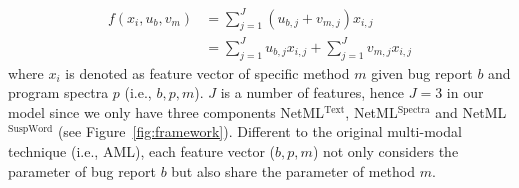 \begin{align}
\label{eq:aml_plus}
f(x_{i}, u_b, v_m) & = \sum_{j = 1}^{J} (u_{b,j} + v_{m,j}) x_{i,j} \nonumber \\
& = \sum_{j = 1}^{J} u_{b,j} x_{i,j} + \sum_{j = 1}^{J} v_{m,j} x_{i,j}
\end{align}
where $x_i$ is denoted as feature vector of specific method $m$ given bug report $b$ and program spectra $p$ (i.e., $b, p, m$). $J$ is a number of features, hence $J = 3$ in our model since we only have three components NetML$^\text{Text}$, NetML$^\text{Spectra}$ and NetML$^\text{SuspWord}$ (see Figure~\ref{fig:framework}). Different to the original multi-modal technique (i.e., AML), each feature vector ($b, p, m$) not only considers the parameter of bug report $b$ but also share the parameter of method $m$.



